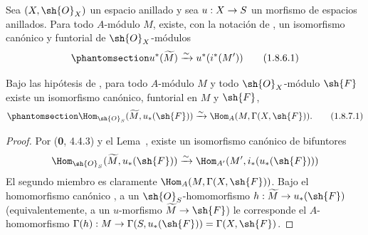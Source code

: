 \documentclass[oneside,10pt]{amsart}
\makeatletter
\newcommand{\ega@arrow}[2]{\mathchoice{#1}{#2}{#2}{#2}}
\renewcommand{\to}{\ega@arrow{\longrightarrow}{\rightarrow}}
\newcommand{\oldpage}[2][]{\marginnote{\normalfont\footnotesize\textbf{#1}~|~#2}\ignorespaces}
\let\EGAOriginalLabel\label
\renewcommand{\label}[1]{\phantomsection\EGAOriginalLabel{#1}}
\makeatother
\begin{document}
\begin{corollary}[1.8.6]
\label{ega2:addendum:I.1.8.6-fr}
Sea $(X,\sh{O}_X)$ un espacio anillado y sea $u:X\to S$ un morfismo de
\oldpage[II]{220}
espacios anillados. Para todo $A$-módulo $M$, existe, con la notación
de , un isomorfismo canónico y funtorial de
$\sh{O}_X$-módulos
\begin{equation}
\label{ega2:addendum:I.1.8.6.1-fr}
  u^*(\widetilde M)\xrightarrow{\sim} u^*(i^*(M'))
\tag{1.8.6.1}
\end{equation}
\end{corollary}

\begin{corollary}[1.8.7]
\label{ega2:addendum:I.1.8.7-fr}
Bajo las hipótesis de , para todo $A$-módulo $M$ y todo
$\sh{O}_X$-módulo $\sh{F}$ existe un isomorfismo canónico, funtorial
en $M$ y $\sh{F}$,
\begin{equation}
\label{ega2:addendum:I.1.8.7.1-fr}
  \Hom_{\sh{O}_S}(\widetilde M,u_*(\sh{F}))
  \xrightarrow{\sim}\Hom_A(M,\Gamma(X,\sh{F})).
\tag{1.8.7.1}
\end{equation}
\end{corollary}

\begin{proof}
Por (\textbf 0, 4.4.3) y el Lema~, existe un isomorfismo
canónico de bifuntores
\[
  \Hom_{\sh{O}_S}(\widetilde M,u_*(\sh{F}))
  \xrightarrow{\sim}\Hom_{A'}(M',i_*(u_*(\sh{F})))
\]
El segundo miembro es claramente $\Hom_A(M,\Gamma(X,\sh{F}))$. Bajo
el homomorfismo canónico , a un
$\sh{O}_S$-homomorfismo
$h:\widetilde M\to u_*(\sh{F})$ (equivalentemente, a un $u$-morfismo
$\widetilde M\to\sh{F}$) le corresponde el $A$-homomorfismo $\Gamma(h):M\to\Gamma(S,u_*(\sh{F}))=\Gamma(X,\sh{F})$.
\end{proof}
\end{document}
